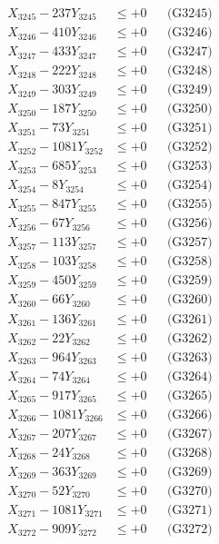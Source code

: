\documentclass[a4paper,10pt]{article}
\begin{document}
{\begin{align}
X_{3245} - 237Y_{3245} &\leq +0 && \text{(G3245)} \\
X_{3246} - 410Y_{3246} &\leq +0 && \text{(G3246)} \\
X_{3247} - 433Y_{3247} &\leq +0 && \text{(G3247)} \\
X_{3248} - 222Y_{3248} &\leq +0 && \text{(G3248)} \\
X_{3249} - 303Y_{3249} &\leq +0 && \text{(G3249)} \\
X_{3250} - 187Y_{3250} &\leq +0 && \text{(G3250)} \\
\allowbreak
X_{3251} - 73Y_{3251} &\leq +0 && \text{(G3251)} \\
X_{3252} - 1081Y_{3252} &\leq +0 && \text{(G3252)} \\
X_{3253} - 685Y_{3253} &\leq +0 && \text{(G3253)} \\
X_{3254} - 8Y_{3254} &\leq +0 && \text{(G3254)} \\
X_{3255} - 847Y_{3255} &\leq +0 && \text{(G3255)} \\
X_{3256} - 67Y_{3256} &\leq +0 && \text{(G3256)} \\
X_{3257} - 113Y_{3257} &\leq +0 && \text{(G3257)} \\
X_{3258} - 103Y_{3258} &\leq +0 && \text{(G3258)} \\
X_{3259} - 450Y_{3259} &\leq +0 && \text{(G3259)} \\
X_{3260} - 66Y_{3260} &\leq +0 && \text{(G3260)} \\
\allowbreak
X_{3261} - 136Y_{3261} &\leq +0 && \text{(G3261)} \\
X_{3262} - 22Y_{3262} &\leq +0 && \text{(G3262)} \\
X_{3263} - 964Y_{3263} &\leq +0 && \text{(G3263)} \\
X_{3264} - 74Y_{3264} &\leq +0 && \text{(G3264)} \\
X_{3265} - 917Y_{3265} &\leq +0 && \text{(G3265)} \\
X_{3266} - 1081Y_{3266} &\leq +0 && \text{(G3266)} \\
X_{3267} - 207Y_{3267} &\leq +0 && \text{(G3267)} \\
X_{3268} - 24Y_{3268} &\leq +0 && \text{(G3268)} \\
X_{3269} - 363Y_{3269} &\leq +0 && \text{(G3269)} \\
X_{3270} - 52Y_{3270} &\leq +0 && \text{(G3270)} \\
\allowbreak
X_{3271} - 1081Y_{3271} &\leq +0 && \text{(G3271)} \\
X_{3272} - 909Y_{3272} &\leq +0 && \text{(G3272)} \\

\end{align}}
\end{document}
